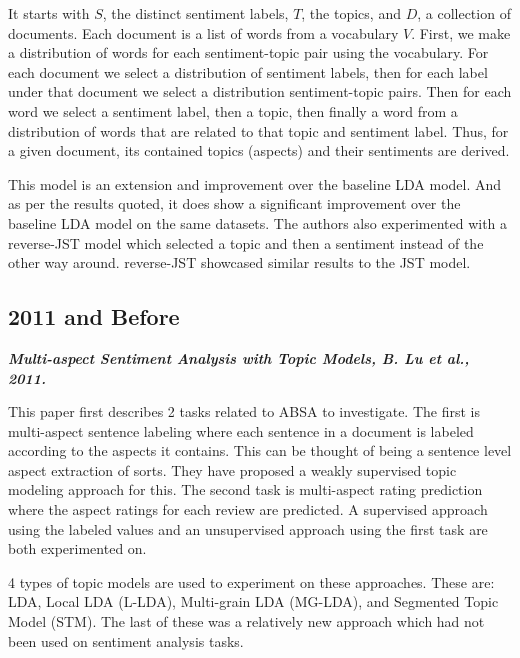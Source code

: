 \documentclass[conference]{IEEEtran}
\begin{document}
It starts with $S$, the distinct sentiment labels, $T$, the topics, and $D$, a collection of documents. Each document is a list of words from a vocabulary $V$. First, we make a distribution of words for each sentiment-topic pair using the vocabulary. For each document we select a distribution of sentiment labels, then for each label under that document we select a distribution sentiment-topic pairs. Then for each word we select a sentiment label, then a topic, then finally a word from a distribution of words that are related to that topic and sentiment label. Thus, for a given document, its contained topics (aspects) and their sentiments are derived.

This model is an extension and improvement over the baseline LDA model. And as per the results quoted, it does show a significant improvement over the baseline LDA model on the same datasets. The authors also experimented with a reverse-JST model which selected a topic and then a sentiment instead of the other way around. reverse-JST showcased similar results to the JST model.\\

\subsection{2011 and Before}

\textit{\textbf{Multi-aspect Sentiment Analysis with Topic Models, B. Lu et al., 2011.}}

This paper first describes 2 tasks related to ABSA to investigate. The first is multi-aspect sentence labeling where each sentence in a document is labeled according to the aspects it contains. This can be thought of being a sentence level aspect extraction of sorts. They have proposed a weakly supervised topic modeling approach for this. The second task is multi-aspect rating prediction where the aspect ratings for each review are predicted. A supervised approach using the labeled values and an unsupervised approach using the first task are both experimented on.

4 types of topic models are used to experiment on these approaches. These are: LDA, Local LDA (L-LDA), Multi-grain LDA (MG-LDA), and Segmented Topic Model (STM). The last of these was a relatively new approach which had not been used on sentiment analysis tasks.
\end{document}
